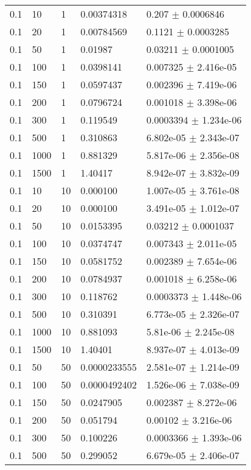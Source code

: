 \begin{longtable}{lllll}
 0.1 &    10 &     1 & 0.00374318 &    0.207 $\pm$ 0.0006846 \\
 0.1 &    20 &     1 & 0.00784569 &   0.1121 $\pm$ 0.0003285 \\
 0.1 &    50 &     1 &  0.01987 &  0.03211 $\pm$ 0.0001005 \\
 0.1 &   100 &     1 & 0.0398141 & 0.007325 $\pm$ 2.416e-05 \\
 0.1 &   150 &     1 & 0.0597437 & 0.002396 $\pm$ 7.419e-06 \\
 0.1 &   200 &     1 & 0.0796724 & 0.001018 $\pm$ 3.398e-06 \\
 0.1 &   300 &     1 & 0.119549 & 0.0003394 $\pm$ 1.234e-06 \\
 0.1 &   500 &     1 & 0.310863 & 6.802e-05 $\pm$ 2.343e-07 \\
 0.1 &  1000 &     1 & 0.881329 & 5.817e-06 $\pm$ 2.356e-08 \\
 0.1 &  1500 &     1 &  1.40417 & 8.942e-07 $\pm$ 3.832e-09 \\
 0.1 &    10 &    10 & 0.000100 & 1.007e-05 $\pm$ 3.761e-08 \\
 0.1 &    20 &    10 & 0.000100  & 3.491e-05 $\pm$ 1.012e-07 \\
 0.1 &    50 &    10 & 0.0153395 &  0.03212 $\pm$ 0.0001037 \\
 0.1 &   100 &    10 & 0.0374747 & 0.007343 $\pm$ 2.011e-05 \\
 0.1 &   150 &    10 & 0.0581752 & 0.002389 $\pm$ 7.654e-06 \\
 0.1 &   200 &    10 & 0.0784937 & 0.001018 $\pm$ 6.258e-06 \\
 0.1 &   300 &    10 & 0.118762 & 0.0003373 $\pm$ 1.448e-06 \\
 0.1 &   500 &    10 & 0.310391 & 6.773e-05 $\pm$ 2.326e-07 \\
 0.1 &  1000 &    10 & 0.881093 & 5.81e-06 $\pm$ 2.245e-08 \\
 0.1 &  1500 &    10 &  1.40401 & 8.937e-07 $\pm$ 4.013e-09 \\
 0.1 &    50 &    50 & 0.0000233555 & 2.581e-07 $\pm$ 1.214e-09 \\
 0.1 &   100 &    50 & 0.0000492402 & 1.526e-06 $\pm$ 7.038e-09 \\
 0.1 &   150 &    50 & 0.0247905 & 0.002387 $\pm$ 8.272e-06 \\
 0.1 &   200 &    50 & 0.051794 &  0.00102 $\pm$ 3.216e-06 \\
 0.1 &   300 &    50 & 0.100226 & 0.0003366 $\pm$ 1.393e-06 \\
 0.1 &   500 &    50 & 0.299052 & 6.679e-05 $\pm$ 2.406e-07 \\

\end{longtable}
